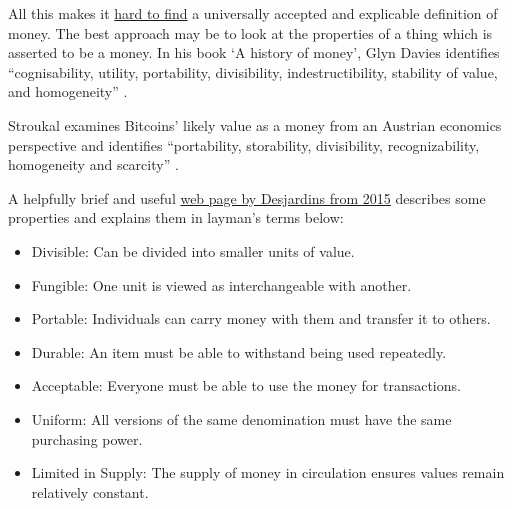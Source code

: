 All this makes it \href{https://www.lynalden.com/what-is-money/}{hard to find} a universally accepted and explicable definition of money. The best approach may be to look at the properties of a thing which is asserted to be a money. In his book `A history of money', Glyn Davies identifies ``cognisability, utility,  portability, divisibility, indestructibility, stability of value, and homogeneity'' \cite{davies2010history}.\par
Stroukal examines Bitcoins' likely value as a money from an Austrian economics perspective and identifies ``portability, storability, divisibility, recognizability, homogeneity and scarcity'' \cite{stroukal2018can}.\par
A helpfully brief and useful \href{http://money.visualcapitalist.com/infographic-the-properties-of-money/}{web page by Desjardins from 2015} describes some properties and explains them in layman's terms below:
\begin{itemize}
\item Divisible: Can be divided into smaller units of value.
\item Fungible: One unit is viewed as interchangeable with another.
\item Portable: Individuals can carry money with them and transfer it to others.
\item Durable: An item must be able to withstand being used repeatedly.
\item Acceptable: Everyone must be able to use the money for transactions.
\item Uniform: All versions of the same denomination must have the same purchasing power.
\item Limited in Supply: The supply of money in circulation ensures values remain relatively constant.
\end{itemize}

